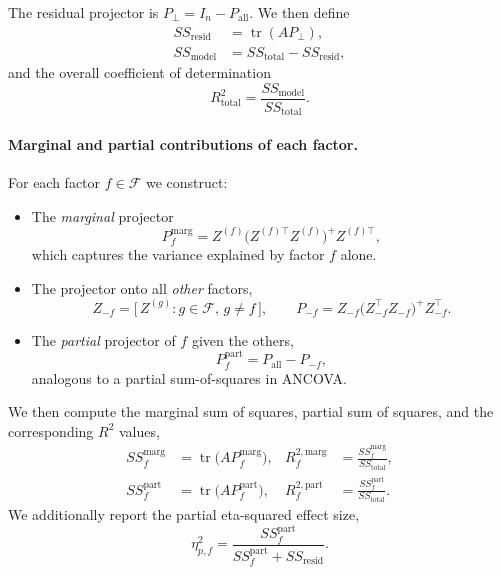 \documentclass[10pt,twocolumn,letterpaper]{article}
\begin{document}
The residual projector is $P_\perp = I_n - P_{\text{all}}$. We then define
\begin{align}
    SS_{\text{resid}} &= \operatorname{tr}(A P_\perp), \\
    SS_{\text{model}} &= SS_{\text{total}} - SS_{\text{resid}},
\end{align}
and the overall coefficient of determination
\begin{equation}
    R^2_{\text{total}} = \frac{SS_{\text{model}}}{SS_{\text{total}}}.
\end{equation}

\paragraph{Marginal and partial contributions of each factor.}
For each factor $f \in \mathcal{F}$ we construct:

\begin{itemize}
    \item The \emph{marginal} projector
    \begin{equation}
        P_f^{\text{marg}} = Z^{(f)} \big(Z^{(f)\top} Z^{(f)}\big)^+ Z^{(f)\top},
    \end{equation}
    which captures the variance explained by factor $f$ alone.
    
    \item The projector onto all \emph{other} factors,
    \begin{equation}
        Z_{-f} = \big[\,Z^{(g)} : g \in \mathcal{F},\, g \neq f\,\big], \qquad
        P_{-f} = Z_{-f} \big(Z_{-f}^\top Z_{-f}\big)^+ Z_{-f}^\top.
    \end{equation}
    
    \item The \emph{partial} projector of $f$ given the others,
    \begin{equation}
        P_f^{\text{part}} = P_{\text{all}} - P_{-f},
    \end{equation}
    analogous to a partial sum-of-squares in ANCOVA.
\end{itemize}

We then compute the marginal sum of squares, partial sum of squares, and the corresponding $R^2$ values,
\begin{align}
    SS_f^{\text{marg}} &= \operatorname{tr}\!\big(A P_f^{\text{marg}}\big), &
    R_f^{2,\text{marg}} &= \frac{SS_f^{\text{marg}}}{SS_{\text{total}}}, \\
    SS_f^{\text{part}} &= \operatorname{tr}\!\big(A P_f^{\text{part}}\big), &
    R_f^{2,\text{part}} &= \frac{SS_f^{\text{part}}}{SS_{\text{total}}}.
\end{align}
We additionally report the partial eta-squared effect size,
\begin{equation}
    \eta_{p,f}^2 = 
    \frac{SS_f^{\text{part}}}{SS_f^{\text{part}} + SS_{\text{resid}}}.
\end{equation}
\end{document}
